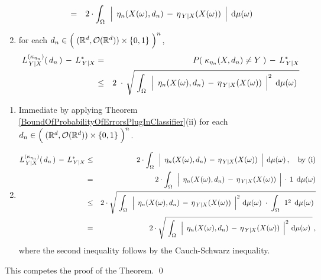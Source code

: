 \begin{theorem}
\begin{enumerate}
\begin{eqnarray*}
	& = &
		2 \cdot \int_{\Omega}\,\;
			\left\vert\;\, \eta_{n}(X(\omega),d_{n}) \,\overset{{\color{white}.}}{-}\, \eta_{\,Y\vert X}(X(\omega)) \;\,\right\vert
			\;\d\mu(\omega)
	\end{eqnarray*}
\item
	for each
	\;$d_{n} \in \left(\;(\Re^{d},\mathcal{O}(\Re^{d})) \overset{{\color{white}.}}{\times} \{0,1\} \;\right)^{n}$,
	\begin{eqnarray*}
	L^{(\kappa_{\eta_{n}})}_{\,Y \vert X}(\,d_{n}\,) \, - \, L^{*}_{\,Y \vert X}
	& = &
		P\!\left(\;\kappa_{\eta_{n}}(X,d_{n}) \neq Y \;\right) \,-\, L^{*}_{\,Y \vert X}
	\\
	& \leq &
		2 \;\cdot\,
		\sqrt{\;\int_{\Omega}\,\;
			\left\vert\;\, \eta_{n}(X(\omega),d_{n}) \,\overset{{\color{white}.}}{-}\, \eta_{\,Y\vert X}(X(\omega)) \;\,\right\vert^{2}
			\;\d\mu(\omega)
			\;}
	\end{eqnarray*}
\end{enumerate}
\end{theorem}
\proof
\begin{enumerate}
\item
	Immediate by applying Theorem \ref{BoundOfProbabilityOfErrorsPlugInClassifier}(ii) for each
	$d_{n} \in \left(\;(\Re^{d},\mathcal{O}(\Re^{d})) \overset{{\color{white}.}}{\times} \{0,1\} \;\right)^{n}$.
\item
	\begin{eqnarray*}
	L^{(\kappa_{\eta_{n}})}_{\,Y \vert X}(\,d_{n}\,) \, - \, L^{*}_{\,Y \vert X}
	& \leq &
		2 \cdot \int_{\Omega}\,\;
			\left\vert\;\, \eta_{n}(X(\omega),d_{n}) \,\overset{{\color{white}.}}{-}\, \eta_{\,Y\vert X}(X(\omega)) \;\,\right\vert
			\;\d\mu(\omega)\,,
		\quad
		\textnormal{by (i)}
	\\
	& = &
		2 \cdot \int_{\Omega}\,\;
			\left\vert\;\, \eta_{n}(X(\omega),d_{n}) \,\overset{{\color{white}.}}{-}\, \eta_{\,Y\vert X}(X(\omega)) \;\,\right\vert
			\,\cdot\, 1
			\,\;\d\mu(\omega)
	\\
	& \leq &
		2 \cdot \sqrt{\;
			\int_{\Omega}\,\;
			\left\vert\;\, \eta_{n}(X(\omega),d_{n}) \,\overset{{\color{white}.}}{-}\, \eta_{\,Y\vert X}(X(\omega)) \;\,\right\vert^{2}
			\,\d\mu(\omega)
			\;\cdot\;
			\int_{\Omega}\,\; 1^{2} \,\;\d\mu(\omega)
			\;}
	\\
	& = &
		2 \cdot \sqrt{\;
			\int_{\Omega}\,\;
			\left\vert\;\, \eta_{n}(X(\omega),d_{n}) \,\overset{{\color{white}.}}{-}\, \eta_{\,Y\vert X}(X(\omega)) \;\,\right\vert^{2}
			\,\d\mu(\omega)
			\;}\,,
	\end{eqnarray*}
	where the second inequality follows by the Cauch-Schwarz inequality.
\end{enumerate}
This competes the proof of the Theorem.
\qed


\renewcommand{\theenumi}{\roman{enumi}}
\renewcommand{\labelenumi}{\textnormal{(\theenumi)}$\;\;$}

